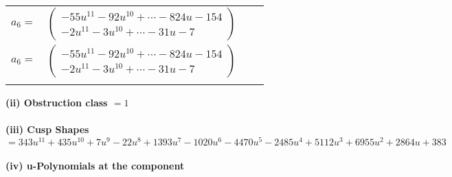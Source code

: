 \documentclass[1p]{elsarticle_modified}
\theoremstyle{definition}
\begin{document}
\begin{tabular}{m{7pt} m{180pt} m{7pt} m{180pt} }
\flushright $a_{6}=$&$\begin{pmatrix}-55 u^{11}-92 u^{10}+\cdots-824 u-154\\-2 u^{11}-3 u^{10}+\cdots-31 u-7\end{pmatrix}$\\ \flushright $a_{6}=$&$\begin{pmatrix}-55 u^{11}-92 u^{10}+\cdots-824 u-154\\-2 u^{11}-3 u^{10}+\cdots-31 u-7\end{pmatrix}$\\&\end{tabular}
\flushleft \textbf{(ii) Obstruction class $= 1$}\\~\\
\flushleft \textbf{(iii) Cusp Shapes $= 343 u^{11}+435 u^{10}+7 u^9-22 u^8+1393 u^7-1020 u^6-4470 u^5-2485 u^4+5112 u^3+6955 u^2+2864 u+383$}\\~\\
\newpage\renewcommand{\arraystretch}{1}
\flushleft \textbf{(iv) u-Polynomials at the component}\newline \\
\end{document}
